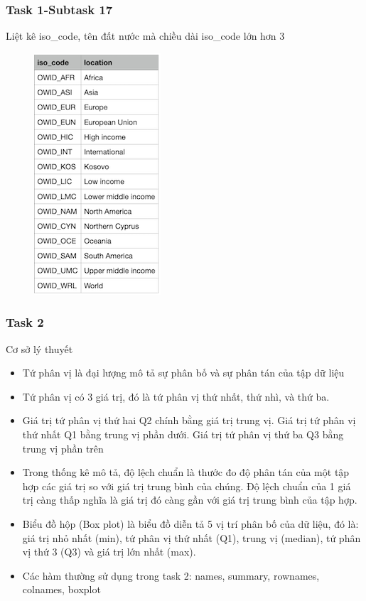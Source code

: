 \documentclass[english,10pt,table]{beamer}
\begin{document}
\frame
{
    \frametitle{Task 1-Subtask 17}
    \begin{block}{Liệt kê iso\_code, tên đất nước mà chiều dài iso\_code lớn hơn 3}
    \begin{figure}[H]
				\centering
				\includegraphics{images/1.17.png}
			\end{figure}
    \end{block}
}
\frame
{
    \frametitle{Task 2}
    \begin{block}{Cơ sở lý thuyết}
    \begin{itemize}
        \item Tứ phân vị là đại lượng mô tả sự phân bố và sự phân tán của tập dữ liệu
        \item Tứ phân vị có 3 giá trị, đó là tứ phân vị thứ nhất, thứ nhì, và thứ ba.
        \item Giá trị tứ phân vị thứ hai Q2 chính bằng giá trị trung vị. Giá trị tứ phân vị thứ nhất Q1 bằng trung vị phần dưới. Giá trị tứ phân vị thứ ba Q3 bằng trung vị phần trên
        \item Trong thống kê mô tả, độ lệch chuẩn là thước đo độ phân tán của một tập hợp các giá trị so với giá trị trung bình của chúng. Độ lệch chuẩn của 1 giá trị càng thấp nghĩa là giá trị đó càng gần với giá trị trung bình của tập hợp.
        \item Biểu đồ hộp (Box plot) là biểu đồ diễn tả 5 vị trí phân bố của dữ liệu, đó là: giá trị nhỏ nhất (min), tứ phân vị thứ nhất (Q1), trung vị (median), tứ phân vị thứ 3 (Q3) và giá trị lớn nhất (max).
        \item Các hàm thường sử dụng trong task 2: names, summary, rownames, colnames, boxplot
    \end{itemize}
    \end{block}
}
\end{document}
